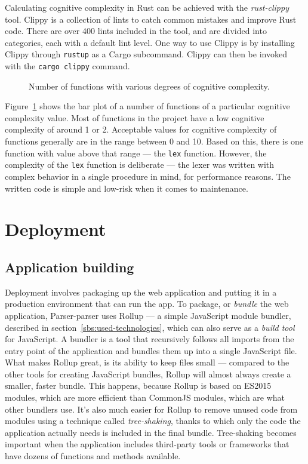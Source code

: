 \documentclass[english,engineering]{wizthesis}
\newcommand{\thisproject}{Parser-parser}
\begin{document}
Calculating cognitive complexity in Rust can be achieved with the
\emph{rust-clippy} tool. Clippy is a collection of lints to catch common
mistakes and improve Rust code. There are over 400 lints included in the tool,
and are divided into categories, each with a default lint level. One way to use
Clippy is by installing Clippy through \texttt{rustup} as a Cargo subcommand.
Clippy can then be invoked with the \texttt{cargo clippy} command.

\begin{figure}[H]
  \centering
  
  \caption{Number of functions with various degrees of cognitive complexity.}
  \label{fig:cognitive-complexity}
\end{figure}

Figure~\ref{fig:cognitive-complexity} shows the bar plot of a number of
functions of a particular cognitive complexity value. Most of functions in the
project have a low cognitive complexity of around 1 or 2. Acceptable values for
cognitive complexity of functions generally are in the range between 0 and 10.
Based on this, there is one function with value above that range --- the
\texttt{lex} function. However, the complexity of the \texttt{lex} function is
deliberate --- the lexer was written with complex behavior in a single procedure
in mind, for performance reasons. The written code is simple and low-risk when
it comes to maintenance.

\newpage

\chapter{Deployment}

\section{Application building}

Deployment involves packaging up the web application and putting it in a
production environment that can run the app. To package, or \emph{bundle} the
web application, \thisproject{} uses Rollup --- a simple JavaScript module
bundler, described in section~\ref{sbs:used-technologies}, which can also serve
as a \emph{build tool} for JavaScript. A bundler is a tool that recursively
follows all imports from the entry point of the application and bundles them up
into a single JavaScript file. What makes Rollup great, is its ability to keep
files small --- compared to the other tools for creating JavaScript bundles,
Rollup will almost always create a smaller, faster bundle. This happens, because
Rollup is based on ES2015 modules, which are more efficient than CommonJS
modules, which are what other bundlers use. It's also much easier for Rollup to
remove unused code from modules using a technique called \emph{tree-shaking},
thanks to which only the code the application actually needs is included in the
final bundle. Tree-shaking becomes important when the application includes
third-party tools or frameworks that have dozens of functions and methods
available.
\end{document}
